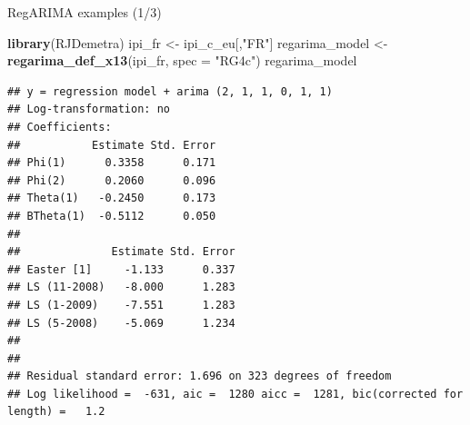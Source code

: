 \documentclass[10pt,xcolor=table,color={dvipsnames,usenames},ignorenonframetext,usepdftitle=false,french]{beamer}
\newenvironment{Shaded}{\begin{snugshade}}{\end{snugshade}}
\newcommand{\DataTypeTok}[1]{\textcolor[rgb]{0.13,0.29,0.53}{#1}}
\newcommand{\KeywordTok}[1]{\textcolor[rgb]{0.13,0.29,0.53}{\textbf{#1}}}
\newcommand{\NormalTok}[1]{#1}
\newcommand{\StringTok}[1]{\textcolor[rgb]{0.31,0.60,0.02}{#1}}
\begin{document}
\begin{frame}[fragile]{RegARIMA examples (1/3)}
\protect\hypertarget{regarima-examples-13}{}

\begin{Shaded}
\begin{Highlighting}[]
\KeywordTok{library}\NormalTok{(RJDemetra)}
\NormalTok{ipi_fr <-}\StringTok{ }\NormalTok{ipi_c_eu[,}\StringTok{"FR"}\NormalTok{]}
\NormalTok{regarima_model <-}\StringTok{ }\KeywordTok{regarima_def_x13}\NormalTok{(ipi_fr, }\DataTypeTok{spec =} \StringTok{"RG4c"}\NormalTok{)}
\NormalTok{regarima_model}
\end{Highlighting}
\end{Shaded}

\begin{verbatim}
## y = regression model + arima (2, 1, 1, 0, 1, 1)
## Log-transformation: no
## Coefficients:
##           Estimate Std. Error
## Phi(1)      0.3358      0.171
## Phi(2)      0.2060      0.096
## Theta(1)   -0.2450      0.173
## BTheta(1)  -0.5112      0.050
## 
##              Estimate Std. Error
## Easter [1]     -1.133      0.337
## LS (11-2008)   -8.000      1.283
## LS (1-2009)    -7.551      1.283
## LS (5-2008)    -5.069      1.234
## 
## 
## Residual standard error: 1.696 on 323 degrees of freedom
## Log likelihood =  -631, aic =  1280 aicc =  1281, bic(corrected for length) =   1.2
\end{verbatim}

\end{frame}
\end{document}
